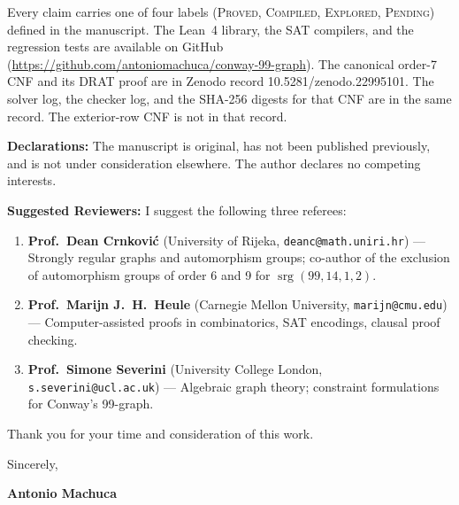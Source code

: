 \documentclass[10pt,a4paper]{article}
\begin{document}
Every claim carries one of four labels (\textsc{Proved}, \textsc{Compiled}, \textsc{Explored}, \textsc{Pending}) defined in the manuscript. The Lean~4 library, the SAT compilers, and the regression tests are available on GitHub (\url{https://github.com/antoniomachuca/conway-99-graph}). The canonical order-7 CNF and its DRAT proof are in Zenodo record 10.5281/zenodo.22995101.
The solver log, the checker log, and the SHA-256 digests for that CNF are in the same record.
The exterior-row CNF is not in that record.

\textbf{Declarations:} The manuscript is original, has not been published previously, and is not under consideration elsewhere. The author declares no competing interests.

\textbf{Suggested Reviewers:} I suggest the following three referees:
\begin{enumerate}[leftmargin=1.5em, itemsep=0.75pt, topsep=0.75pt]
  \item \textbf{Prof.~Dean Crnkovi{\'c}} (University of Rijeka, \texttt{deanc@math.uniri.hr}) --- Strongly regular graphs and automorphism groups; co-author of the exclusion of automorphism groups of order 6 and 9 for $\operatorname{srg}(99,14,1,2)$.
  \item \textbf{Prof.~Marijn J.~H.~Heule} (Carnegie Mellon University, \texttt{marijn@cmu.edu}) --- Computer-assisted proofs in combinatorics, SAT encodings, clausal proof checking.
  \item \textbf{Prof.~Simone Severini} (University College London, \texttt{s.severini@ucl.ac.uk}) --- Algebraic graph theory; constraint formulations for Conway's 99-graph.
\end{enumerate}

Thank you for your time and consideration of this work.

\vspace{0.4em}
Sincerely,

\vspace{0.4em}
\textbf{Antonio Machuca}
\end{document}

